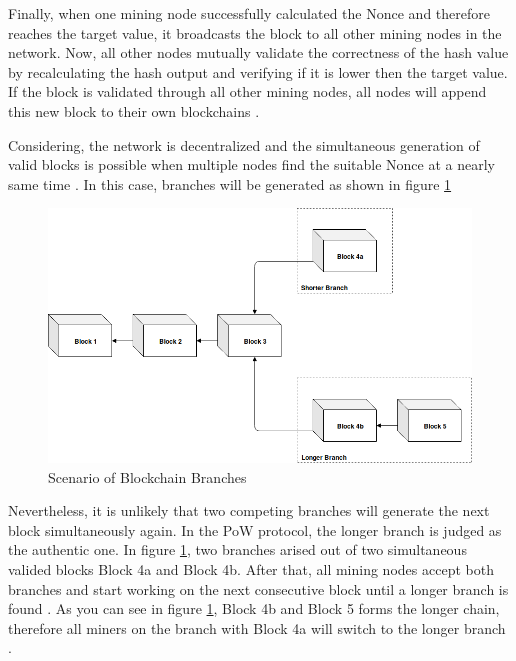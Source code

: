 Finally, when one mining node successfully calculated the Nonce and therefore reaches the target value, 
it broadcasts the block to all other mining nodes in the network. Now, all other nodes mutually validate the correctness of the hash value
by recalculating the hash output and verifying if it is lower then the target value. 
If the block is validated through all other mining nodes, all nodes will append this new block to their own blockchains .  

Considering, the network is decentralized and the simultaneous generation of valid blocks is possible when multiple nodes find 
the suitable Nonce at a nearly same time . In this case, branches will be generated as shown in figure \ref{figure:blockchain_branches}

\begin{figure}[htbp]
	\centering
	\includegraphics[width=.9\linewidth]{./figures/blockchain_branches.png}
	\caption{Scenario of Blockchain Branches}
	\label{figure:blockchain_branches}
\end{figure}

Nevertheless, it is unlikely that two competing branches will generate the next block simultaneously again. 
In the PoW protocol, the longer branch is judged as the authentic one. 
In figure \ref{figure:blockchain_branches}, two branches arised out of 
two simultaneous valided blocks Block 4a and Block 4b. 
After that, all mining nodes accept both branches and start working on 
the next consecutive block until a longer branch is found . 
As you can see in figure \ref{figure:blockchain_branches}, Block 4b and Block 5 forms the longer 
chain, therefore all miners on the branch with Block 4a will switch to 
the longer branch . 

